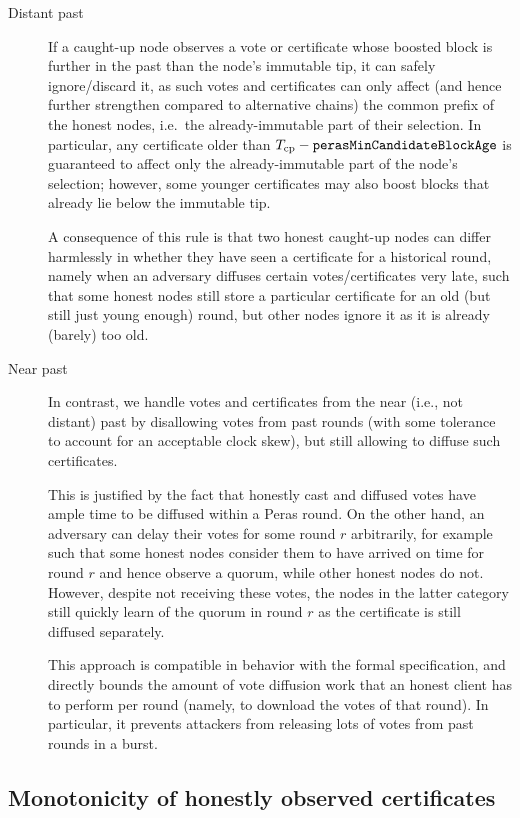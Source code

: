 \begin{description}
\item[Distant past]
  If a caught-up node observes a vote or certificate whose boosted block is further in the past than the node's immutable tip, it can safely ignore/discard it, as such votes and certificates can only affect (and hence further strengthen compared to alternative chains) the common prefix of the honest nodes, i.e.\ the already-immutable part of their selection. In particular, any certificate older than $T_{\text{cp}}-\mathtt{perasMinCandidateBlockAge}$ is guaranteed to affect only the already-immutable part of the node's selection; however, some younger certificates may also boost blocks that already lie below the immutable tip.

  A consequence of this rule is that two honest caught-up nodes can differ harmlessly in whether they have seen a certificate for a historical round, namely when an adversary diffuses certain votes/certificates very late, such that some honest nodes still store a particular certificate for an old (but still just young enough) round, but other nodes ignore it as it is already (barely) too old.
\item[Near past]
  In contrast, we handle votes and certificates from the near (i.e., not distant) past by disallowing votes from past rounds (with some tolerance to account for an acceptable clock skew), but still allowing to diffuse such certificates.

  This is justified by the fact that honestly cast and diffused votes have ample time to be diffused within a Peras round.
  On the other hand, an adversary can delay their votes for some round $r$ arbitrarily, for example such that some honest nodes consider them to have arrived on time for round $r$ and hence observe a quorum, while other honest nodes do not.
  However, despite not receiving these votes, the nodes in the latter category still quickly learn of the quorum in round $r$ as the certificate is still diffused separately.

  This approach is compatible in behavior with the formal specification, and directly bounds the amount of vote diffusion work that an honest client has to perform per round (namely, to download the votes of that round).
  In particular, it prevents attackers from releasing lots of votes from past rounds in a burst.
\end{description}

\subsection{Monotonicity of honestly observed certificates}\label{sec:cert monotonicity}

